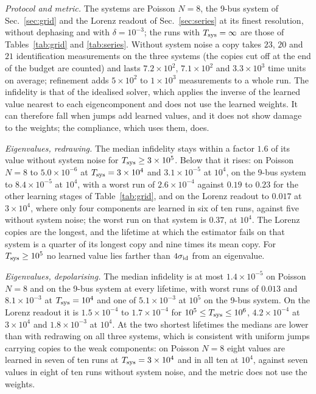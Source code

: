\documentclass[journal]{IEEEtran}
\begin{document}
\emph{Protocol and metric.} The systems are Poisson $N=8$, the 9-bus system of Sec.~\ref{sec:grid} and the Lorenz readout of Sec.~\ref{sec:series} at its finest resolution, without dephasing and with $\delta=10^{-3}$; the runs with $T_{\rm sys}=\infty$ are those of Tables~\ref{tab:grid} and \ref{tab:series}. Without system noise a copy takes $23$, $20$ and $21$ identification measurements on the three systems (the copies cut off at the end of the budget are counted) and lasts $7.2\times10^2$, $7.1\times10^2$ and $3.3\times10^3$ time units on average; refinement adds $5\times10^2$ to $1\times10^3$ measurements to a whole run. The infidelity is that of the idealised solver, which applies the inverse of the learned value nearest to each eigencomponent and does not use the learned weights. It can therefore fall when jumps add learned values, and it does not show damage to the weights; the compliance, which uses them, does.

\emph{Eigenvalues, redrawing.} The median infidelity stays within a factor $1.6$ of its value without system noise for $T_{\rm sys}\ge3\times10^5$. Below that it rises: on Poisson $N=8$ to $5.0\times10^{-6}$ at $T_{\rm sys}=3\times10^4$ and $3.1\times10^{-5}$ at $10^4$, on the 9-bus system to $8.4\times10^{-5}$ at $10^4$, with a worst run of $2.6\times10^{-4}$ against $0.19$ to $0.23$ for the other learning stages of Table~\ref{tab:grid}, and on the Lorenz readout to $0.017$ at $3\times10^4$, where only four components are learned in six of ten runs, against five without system noise; the worst run on that system is $0.37$, at $10^4$. The Lorenz copies are the longest, and the lifetime at which the estimator fails on that system is a quarter of its longest copy and nine times its mean copy. For $T_{\rm sys}\ge10^5$ no learned value lies farther than $4\sigma_{\rm id}$ from an eigenvalue.

\emph{Eigenvalues, depolarising.} The median infidelity is at most $1.4\times10^{-5}$ on Poisson $N=8$ and on the 9-bus system at every lifetime, with worst runs of $0.013$ and $8.1\times10^{-3}$ at $T_{\rm sys}=10^4$ and one of $5.1\times10^{-3}$ at $10^5$ on the 9-bus system. On the Lorenz readout it is $1.5\times10^{-4}$ to $1.7\times10^{-4}$ for $10^5\le T_{\rm sys}\le10^6$, $4.2\times10^{-4}$ at $3\times10^4$ and $1.8\times10^{-3}$ at $10^4$. At the two shortest lifetimes the medians are lower than with redrawing on all three systems, which is consistent with uniform jumps carrying copies to the weak components: on Poisson $N=8$ eight values are learned in seven of ten runs at $T_{\rm sys}=3\times10^4$ and in all ten at $10^4$, against seven values in eight of ten runs without system noise, and the metric does not use the weights.
\end{document}
